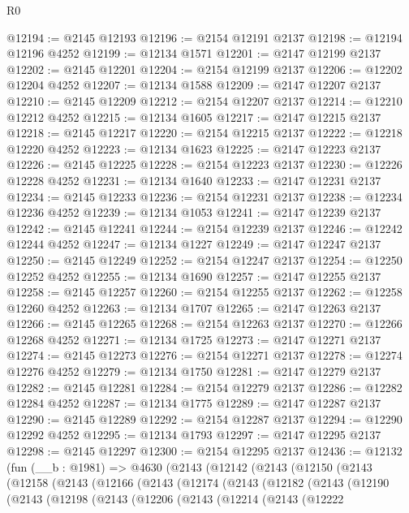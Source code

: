 \begin{lexlean}{R0}
\begin{coremodule}
@12194 := @2145 @12193
@12196 := @2154 @12191 @2137
@12198 := @12194 @12196 @4252
@12199 := @12134 @1571
@12201 := @2147 @12199 @2137
@12202 := @2145 @12201
@12204 := @2154 @12199 @2137
@12206 := @12202 @12204 @4252
@12207 := @12134 @1588
@12209 := @2147 @12207 @2137
@12210 := @2145 @12209
@12212 := @2154 @12207 @2137
@12214 := @12210 @12212 @4252
@12215 := @12134 @1605
@12217 := @2147 @12215 @2137
@12218 := @2145 @12217
@12220 := @2154 @12215 @2137
@12222 := @12218 @12220 @4252
@12223 := @12134 @1623
@12225 := @2147 @12223 @2137
@12226 := @2145 @12225
@12228 := @2154 @12223 @2137
@12230 := @12226 @12228 @4252
@12231 := @12134 @1640
@12233 := @2147 @12231 @2137
@12234 := @2145 @12233
@12236 := @2154 @12231 @2137
@12238 := @12234 @12236 @4252
@12239 := @12134 @1053
@12241 := @2147 @12239 @2137
@12242 := @2145 @12241
@12244 := @2154 @12239 @2137
@12246 := @12242 @12244 @4252
@12247 := @12134 @1227
@12249 := @2147 @12247 @2137
@12250 := @2145 @12249
@12252 := @2154 @12247 @2137
@12254 := @12250 @12252 @4252
@12255 := @12134 @1690
@12257 := @2147 @12255 @2137
@12258 := @2145 @12257
@12260 := @2154 @12255 @2137
@12262 := @12258 @12260 @4252
@12263 := @12134 @1707
@12265 := @2147 @12263 @2137
@12266 := @2145 @12265
@12268 := @2154 @12263 @2137
@12270 := @12266 @12268 @4252
@12271 := @12134 @1725
@12273 := @2147 @12271 @2137
@12274 := @2145 @12273
@12276 := @2154 @12271 @2137
@12278 := @12274 @12276 @4252
@12279 := @12134 @1750
@12281 := @2147 @12279 @2137
@12282 := @2145 @12281
@12284 := @2154 @12279 @2137
@12286 := @12282 @12284 @4252
@12287 := @12134 @1775
@12289 := @2147 @12287 @2137
@12290 := @2145 @12289
@12292 := @2154 @12287 @2137
@12294 := @12290 @12292 @4252
@12295 := @12134 @1793
@12297 := @2147 @12295 @2137
@12298 := @2145 @12297
@12300 := @2154 @12295 @2137
@12436 := @12132
    (fun (__b : @1981) =>
    @4630
      (@2143
        (@12142
          (@2143
            (@12150
              (@2143
                (@12158
                  (@2143
                    (@12166
                      (@2143
                        (@12174
                          (@2143
                            (@12182
                              (@2143
                                (@12190
                                  (@2143
                                    (@12198
                                      (@2143
                                        (@12206
                                          (@2143
                                            (@12214
                                              (@2143
                                                (@12222

\end{coremodule}
\end{lexlean}
